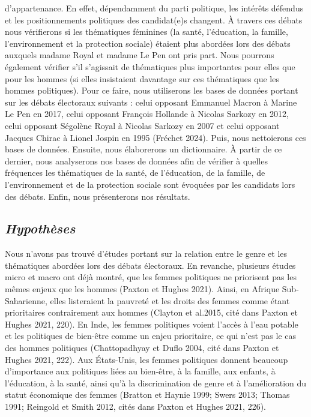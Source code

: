 \documentclass[
  letterpaper,
  DIV=11,
  numbers=noendperiod]{scrartcl}
\begin{document}
d'appartenance. En effet, dépendamment du parti politique, les intérêts
défendus et les positionnements politiques des candidat(e)s changent. À
travers ces débats nous vérifierons si les thématiques féminines (la
santé, l'éducation, la famille, l'environnement et la protection
sociale) étaient plus abordées lors des débats auxquels madame Royal et
madame Le Pen ont pris part. Nous pourrons également vérifier s'il
s'agissait de thématiques plus importantes pour elles que pour les
hommes (si elles insistaient davantage sur ces thématiques que les
hommes politiques). Pour ce faire, nous utiliserons les bases de données
portant sur les débats électoraux suivants : celui opposant Emmanuel
Macron à Marine Le Pen en 2017, celui opposant François Hollande à
Nicolas Sarkozy en 2012, celui opposant Ségolène Royal à Nicolas Sarkozy
en 2007 et celui opposant Jacques Chirac à Lionel Jospin en 1995
(Fréchet 2024). Puis, nous nettoierons ces bases de données. Ensuite,
nous élaborerons un dictionnaire. À partir de ce dernier, nous
analyserons nos bases de données afin de vérifier à quelles fréquences
les thématiques de la santé, de l'éducation, de la famille, de
l'environnement et de la protection sociale sont évoquées par les
candidats lors des débats. Enfin, nous présenterons nos résultats.

\hypertarget{hypothuxe8ses}{%
\subsection{\texorpdfstring{\emph{Hypothèses}}{Hypothèses}}\label{hypothuxe8ses}}

Nous n'avons pas trouvé d'études portant sur la relation entre le genre
et les thématiques abordées lors des débats électoraux. En revanche,
plusieurs études micro et macro ont déjà montré, que les femmes
politiques ne priorisent pas les mêmes enjeux que les hommes (Paxton et
Hughes 2021). Ainsi, en Afrique Sub-Saharienne, elles listeraient la
pauvreté et les droits des femmes comme étant prioritaires contrairement
aux hommes (Clayton et al.2015, cité dans Paxton et Hughes 2021, 220).
En Inde, les femmes politiques voient l'accès à l'eau potable et les
politiques de bien-être comme un enjeu prioritaire, ce qui n'est pas le
cas des hommes politiques (Chattopadhyay et Duflo 2004, cité dans Paxton
et Hughes 2021, 222). Aux États-Unis, les femmes politiques donnent
beaucoup d'importance aux politiques liées au bien-être, à la famille,
aux enfants, à l'éducation, à la santé, ainsi qu'à la discrimination de
genre et à l'amélioration du statut économique des femmes (Bratton et
Haynie 1999; Swers 2013; Thomas 1991; Reingold et Smith 2012, cités dans
Paxton et Hughes 2021, 226).
\end{document}
